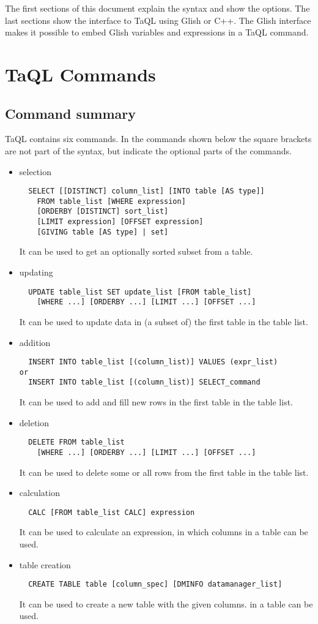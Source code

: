The first sections of this document explain the syntax and show the options.
The last sections show the interface to TaQL using Glish or C++.
The Glish interface makes it possible to embed Glish
variables and expressions in a TaQL command.

\section{TaQL Commands}
\subsection{Command summary}
TaQL contains six commands.
In the commands shown below the square brackets are not part of the
syntax, but indicate the optional parts of the commands.

\begin{itemize}
\item selection
\begin{verbatim}
  SELECT [[DISTINCT] column_list] [INTO table [AS type]]
    FROM table_list [WHERE expression]
    [ORDERBY [DISTINCT] sort_list]
    [LIMIT expression] [OFFSET expression]
    [GIVING table [AS type] | set]
\end{verbatim}
It can be used to get an optionally sorted subset from a table.

\item updating
\begin{verbatim}
  UPDATE table_list SET update_list [FROM table_list]
    [WHERE ...] [ORDERBY ...] [LIMIT ...] [OFFSET ...]
\end{verbatim}
It can be used to update data in (a subset of) the first table in the
table list. 

\item addition
\begin{verbatim}
  INSERT INTO table_list [(column_list)] VALUES (expr_list)
or
  INSERT INTO table_list [(column_list)] SELECT_command
\end{verbatim}
It can be used to add and fill new rows in the first table in the
table list.

\item deletion
\begin{verbatim}
  DELETE FROM table_list
    [WHERE ...] [ORDERBY ...] [LIMIT ...] [OFFSET ...]
\end{verbatim}
It can be used to delete some or all rows from the first table
in the table list.

\item calculation
\begin{verbatim}
  CALC [FROM table_list CALC] expression
\end{verbatim}
It can be used to calculate an expression, in which columns
in a table can be used.

\item table creation
\begin{verbatim}
  CREATE TABLE table [column_spec] [DMINFO datamanager_list]
\end{verbatim}
It can be used to create a new table with the given columns.
in a table can be used.

\end{itemize}
